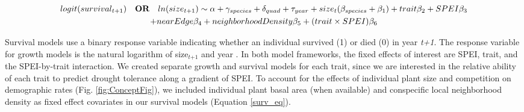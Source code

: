\documentclass[12pt, letterpaper]{article}
\begin{document}
\begin{multline}
\label{surv_eq}
logit(survival_{t+1})\quad \textbf{\text{OR}} \quad ln(size_{t+1}) \sim \alpha + \gamma_{species}+ \delta_{quad} + \tau_{year} + size_t(\beta_{species}  + \beta_1) + trait\beta_2+ SPEI\beta_3\\ + nearEdge\beta_4  + neighborhoodDensity\beta_5 + (trait\times SPEI)\beta_6
\end{multline}

Survival models use a binary response variable indicating whether an individual survived (1) or died (0) in year \textit{t+1}. The response variable for growth models is the natural logarithm of size$_\textit{t+1}$ and year \citep{Dalgleish2011ClimatePlants, Dahlgren2009LinkingHerb}. In both model frameworks, the fixed effects of interest are SPEI, trait, and the SPEI-by-trait interaction. We created separate growth and survival models for each trait, since we are interested in the relative ability of each trait to predict drought tolerance along a gradient of SPEI. To account for the effects of individual plant size \citep{Tredennick2018} and competition on demographic rates (Fig. \ref{fig:ConceptFig}), we included individual plant basal area (when available) and conspecific local neighborhood density as fixed effect covariates in our survival models (Equation \ref{surv_eq}). 
\end{document}
